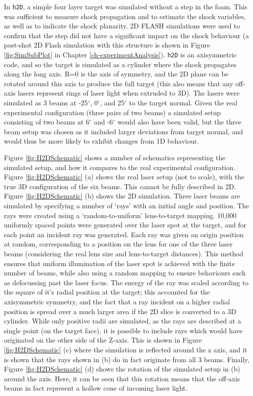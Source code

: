 In \texttt{h2D}, a simple four layer target was simulated without a step in the foam. This was sufficient to measure shock propagation and to estimate the shock variables, as well as to indicate the shock planarity. 2D FLASH simulations were used to confirm that the step did not have a significant impact on the shock behaviour (a post-shot 2D Flash simulation with this structure is shown in Figure \ref{fig:SimSubPlot} in Chapter \ref{ch-experimentAnalysis}). \texttt{h2D} is an axisymmetric code, and so the target is simulated as a cylinder where the shock propagates along the long axis. R=0 is the axis of symmetry, and the 2D plane can be rotated around this axis to produce the full target (this also means that any off-axis lasers represent rings of laser light when extruded to 3D). The lasers were simulated as 3 beams at -25$^{\circ}$, 0$^{\circ}$, and 25$^{\circ}$ to the target normal. Given the real experimental configuration (three pairs of two beams) a simulated setup consisting of two beams at 6$^{\circ}$ and -6$^{\circ}$ would also have been valid, but the three beam setup was chosen as it included larger deviations from target normal, and would thus be more likely to exhibit changes from 1D behaviour. 

Figure \ref{fig:H2DSchematic} shows a number of schematics representing the simulated setup, and how it compares to the real experimental configuration. Figure \ref{fig:H2DSchematic} (a) shows the real laser setup (not to scale), with the true 3D configuration of the six beams. This cannot be fully described in 2D. Figure \ref{fig:H2DSchematic} (b) shows the 2D simulation. Three laser beams are simulated by specifying a number of `rays' with an initial angle and position. The rays were created using a `random-to-uniform' lens-to-target mapping. 10,000 uniformly spaced points were generated over the laser spot at the target, and for each point an incident ray was generated. Each ray was given an origin position at random, corresponding to a position on the lens for one of the three laser beams (considering the real lens size and lens-to-target distances). This method ensures that uniform illumination of the laser spot is achieved with the finite number of beams, while also using a random mapping to ensure behaviours such as defocussing past the laser focus. The energy of the ray was scaled according to the square of it's radial position at the target; this accounted for the axisymmetric symmetry, and the fact that a ray incident on a higher radial position is spread over a much larger area if the 2D slice is converted to a 3D cylinder. While only positive radii are simulated, as the rays are described at a single point (on the target face), it is possible to include rays which would have originated on the other side of the Z-axis. This is shown in Figure \ref{fig:H2DSchematic} (c) where the simulation is reflected around the z axis, and it is shown that the rays shown in (b) do in fact originate from all 3 beams. Finally, Figure \ref{fig:H2DSchematic} (d) shows the rotation of the simulated setup in (b) around the axis. Here, it can be seen that this rotation means that the off-axis beams in fact represent a hollow cone of incoming laser light.

